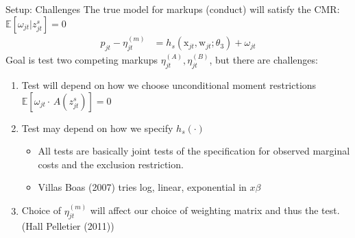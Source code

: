 \documentclass[xcolor=pdftex,dvipsnames,table,mathserif,aspectratio=169]{beamer}
\begin{document}


\begin{frame}{Setup: Challenges}
The true model for markups (conduct) will satisfy the CMR: $\mathbb{E}[\omega_{jt} | z_{jt}^s]=0$
\begin{align*}p_{jt} - \eta_{jt}^{(m)} &= h_s(\textrm{x}_{jt}, \textrm{w}_{jt}; \theta_3) + \omega_{jt}
\end{align*}
Goal is test two competing markups $\eta_{jt}^{(A)},\eta_{jt}^{(B)}$, but there are challenges:
\pause
\begin{enumerate}
\item Test will depend on how we choose \alert{unconditional moment restrictions} $\mathbb{E}[\omega_{jt} \cdot \, A(z_{jt}^s)]=0$
\pause
\item Test may depend on how we specify $h_s(\cdot)$
\begin{itemize}
\item All tests are basically joint tests of the specification for \alert{observed marginal costs} and the  \alert{exclusion restriction}.
\item Villas Boas (2007) tries log, linear, exponential in $x \beta $
\end{itemize}
\pause
\item Choice of $\eta_{jt}^{(m)}$ will affect our choice of \alert{weighting matrix} and thus the test. (Hall Pelletier (2011))
\end{enumerate}
\end{frame}
\end{document}
